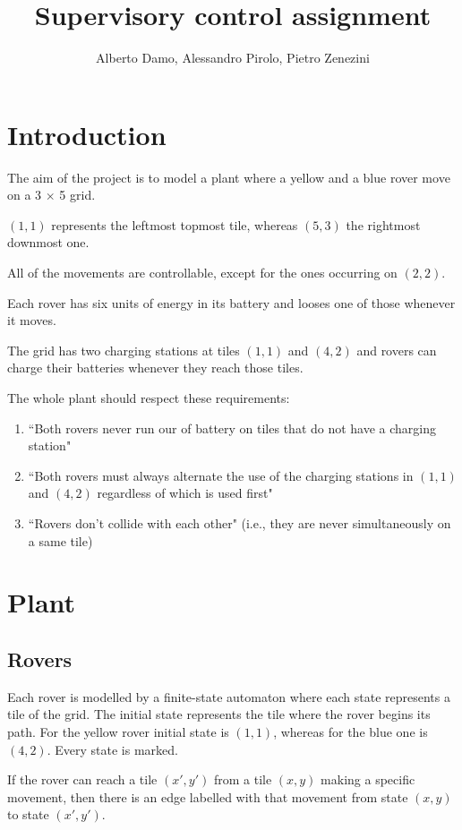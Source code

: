 \documentclass{article}
\title{Supervisory control assignment}
\author{Alberto Damo, Alessandro Pirolo, Pietro Zenezini}
\begin{document}
\maketitle
\newpage
{}
\tableofcontents
\newpage
{}
\section{Introduction}
The aim of the project is to model a plant
where a yellow and a blue rover move on a 3 $\times$ 5 grid.

$(1,1)$ represents the leftmost topmost tile, whereas $(5,3)$ the rightmost downmost one.

All of the movements are controllable, except for the ones
occurring on $(2,2)$.

Each rover has six units of energy in its battery and looses one of those
whenever it moves.

The grid has two charging stations at tiles $(1,1)$ and $(4,2)$
and rovers can charge their batteries whenever they reach those tiles.

The whole plant should respect these requirements:
\begin{enumerate}
    \item ``Both rovers never run our of battery on tiles that do not have a charging station"
    \item ``Both rovers must always alternate the use of the charging stations in $(1,1)$ and $(4,2)$ regardless of which is used first"
    \item ``Rovers don't collide with each other" (i.e., they are never simultaneously on a same tile)
\end{enumerate}

\section{Plant}
\subsection{Rovers}
Each rover is modelled by a finite-state automaton
where each state represents a tile of the grid.
The initial state represents the tile where the rover begins its path.
For the yellow rover initial state is $(1,1)$, whereas
for the blue one is $(4,2)$.
Every state is marked.

If the rover can reach a tile $(x', y')$ from a tile $(x, y)$
making a specific movement, then there is an edge labelled
with that movement from state $(x, y)$ to state $(x', y')$.
\end{document}
